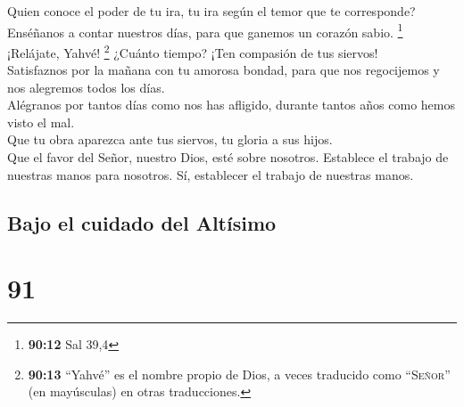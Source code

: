  Quien conoce el poder de tu ira, tu ira según el temor
que te corresponde?\\
 Enséñanos a contar nuestros días, para que ganemos un
corazón sabio. \footnote{\textbf{90:12} Sal 39,4}\\
 ¡Relájate, Yahvé! \footnote{\textbf{90:13} ``Yahvé'' es
  el nombre propio de Dios, a veces traducido como ``\textsc{Señor}''
  (en mayúsculas) en otras traducciones.} ¿Cuánto tiempo? ¡Ten compasión
de tus siervos!\\
 Satisfaznos por la mañana con tu amorosa bondad, para
que nos regocijemos y nos alegremos todos los días.\\
 Alégranos por tantos días como nos has afligido, durante
tantos años como hemos visto el mal.\\
 Que tu obra aparezca ante tus siervos, tu gloria a sus
hijos.\\
 Que el favor del Señor, nuestro Dios, esté sobre
nosotros. Establece el trabajo de nuestras manos para nosotros. Sí,
establecer el trabajo de nuestras manos.

\hypertarget{bajo-el-cuidado-del-altuxedsimo}{%
\subsection{Bajo el cuidado del
Altísimo}\label{bajo-el-cuidado-del-altuxedsimo}}

\hypertarget{section-88}{%
\section{91}\label{section-88}}

